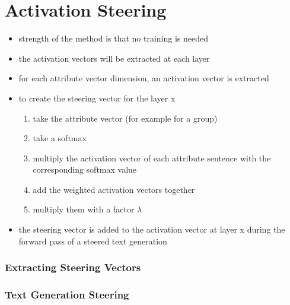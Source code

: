 \section{Activation Steering}
\label{sec:approach:steering:activation}
\begin{itemize}
  \item strength of the method is that no training is needed
  \item the activation vectors will be extracted at each layer
  \item for each attribute vector dimension, an activation vector is extracted
  \item to create the steering vector for the layer x
        \begin{enumerate}
          \item take the attribute vector (for example for a group)
          \item take a softmax
          \item multiply the activation vector of each attribute sentence with the corresponding softmax value
          \item add the weighted activation vectors together
          \item multiply them with a factor \(\lambda\)
        \end{enumerate}
  \item the steering vector is added to the activation vector at layer x during the forward pass of a steered text generation
\end{itemize}

\subsubsection{Extracting Steering Vectors}

\subsubsection{Text Generation Steering}